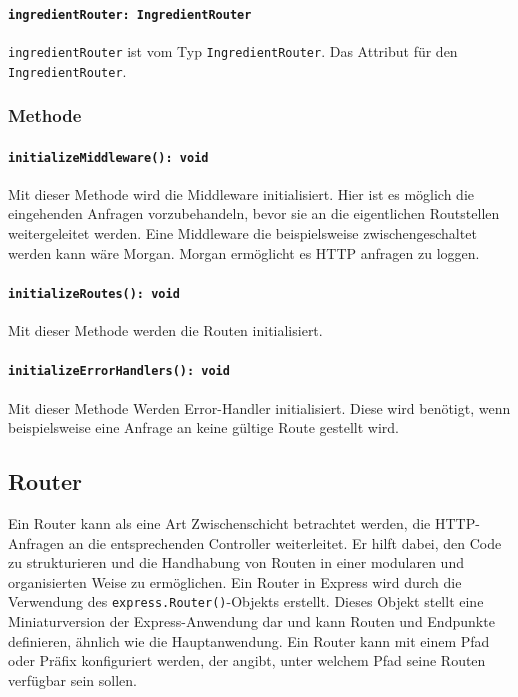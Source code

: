 \documentclass{entwurfsheft}
\begin{document}
\paragraph{\texttt{ingredientRouter: IngredientRouter}}
\texttt{ingredientRouter} ist vom Typ \texttt{IngredientRouter}.
Das Attribut für den \texttt{IngredientRouter}. \newline

\subsubsection*{Methode}
\paragraph{\texttt{initializeMiddleware(): void}}
Mit dieser Methode wird die Middleware initialisiert. Hier ist es möglich die eingehenden Anfragen vorzubehandeln, bevor sie an die eigentlichen Routstellen weitergeleitet werden.
Eine Middleware die beispielsweise zwischengeschaltet werden kann wäre Morgan. Morgan ermöglicht es HTTP anfragen zu loggen.
\paragraph{\texttt{initializeRoutes(): void}}
Mit dieser Methode werden die Routen initialisiert.
\paragraph{\texttt{initializeErrorHandlers(): void}}
Mit dieser Methode Werden Error-Handler initialisiert. Diese wird benötigt, wenn beispielsweise eine Anfrage an keine gültige Route gestellt wird.

\newpage

\subsection{Router}
Ein Router kann als eine Art Zwischenschicht betrachtet werden, die HTTP-Anfragen an die entsprechenden Controller weiterleitet.
Er hilft dabei, den Code zu strukturieren und die Handhabung von Routen in einer modularen und organisierten Weise zu ermöglichen.
Ein Router in Express wird durch die Verwendung des \texttt{express.Router()}-Objekts erstellt.
Dieses Objekt stellt eine Miniaturversion der Express-Anwendung dar und kann Routen und Endpunkte definieren, ähnlich wie die Hauptanwendung.
Ein Router kann mit einem Pfad oder Präfix konfiguriert werden, der angibt, unter welchem Pfad seine Routen verfügbar sein sollen.
\end{document}
